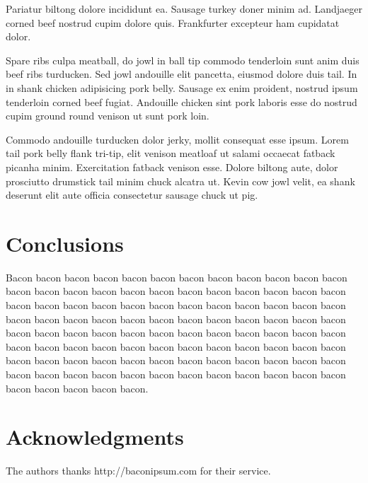 \documentclass[a4paper,10pt]{article}
\begin{document}
Pariatur biltong dolore incididunt ea. Sausage turkey doner minim ad. Landjaeger corned beef nostrud cupim dolore quis. Frankfurter excepteur ham cupidatat dolor.

Spare ribs culpa meatball, do jowl in ball tip commodo tenderloin sunt anim duis beef ribs turducken. Sed jowl andouille elit pancetta, eiusmod dolore duis tail. In in shank chicken adipisicing pork belly. Sausage ex enim proident, nostrud ipsum tenderloin corned beef fugiat. Andouille chicken sint pork laboris esse do nostrud cupim ground round venison ut sunt pork loin.

Commodo andouille turducken dolor jerky, mollit consequat esse ipsum. Lorem tail pork belly flank tri-tip, elit venison meatloaf ut salami occaecat fatback picanha minim. Exercitation fatback venison esse. Dolore biltong aute, dolor prosciutto drumstick tail minim chuck alcatra ut. Kevin cow jowl velit, ea shank deserunt elit aute officia consectetur sausage chuck ut pig.

\section{Conclusions}

Bacon bacon bacon bacon bacon bacon bacon bacon bacon bacon bacon bacon bacon bacon bacon bacon bacon bacon bacon bacon bacon bacon bacon bacon bacon bacon bacon bacon bacon bacon bacon bacon bacon bacon bacon bacon bacon bacon bacon bacon bacon bacon bacon bacon bacon bacon bacon bacon bacon bacon bacon bacon bacon bacon bacon bacon bacon bacon bacon bacon bacon bacon bacon bacon bacon bacon bacon bacon bacon bacon bacon bacon bacon bacon bacon bacon bacon bacon bacon bacon bacon bacon bacon bacon bacon bacon bacon bacon bacon bacon bacon bacon bacon bacon bacon bacon bacon bacon bacon bacon bacon. 

\section*{Acknowledgments}

The authors thanks http://baconipsum.com for their service.
\end{document}
